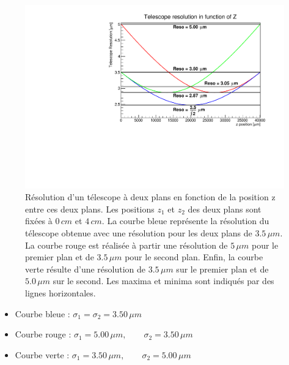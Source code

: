   \begin{figure}[!htb]
    \begin{center}
      \includegraphics[scale=0.6]{./figures/Plot_reso_vs_z/reso_vs_Z2.pdf}
      \caption{R\'esolution d'un t\'elescope \`a deux plans en fonction de la position z entre ces deux plans. Les positions $z_1$ et $z_2$ des deux plans sont fix\'ees \`a $0 \, cm$ et $4 \, cm$. La courbe bleue repr\'esente la r\'esolution du t\'elescope obtenue avec une r\'esolution pour les deux plans de $3.5 \, \mu m$. La courbe rouge est r\'ealis\'ee \`a partir une r\'esolution de $5 \, \mu m$ pour le premier plan et de $3.5 \,\mu m$ pour le second plan. Enfin, la courbe verte r\'esulte d'une r\'esolution de $3.5 \, \mu m$ sur le premier plan et de $5.0 \, \mu m$ sur le second. Les maxima et minima sont indiqu\'es par des lignes horizontales. }
      \label{fig:resoTelescope_Z}
    \end{center}
  \end{figure}  
  
  \medskip
   
  \renewcommand{\labelitemi}{$\bullet$}
  
  \begin{itemize}
   \item Courbe bleue : $\sigma_1 = \sigma_2 = 3.50 \, \mu m$
   \item Courbe rouge : $\sigma_1 = 5.00 \, \mu m, \qquad \sigma_2 = 3.50 \, \mu m$
   \item Courbe verte : $\sigma_1 = 3.50 \, \mu m, \qquad \sigma_2 = 5.00 \, \mu m$
  \end{itemize}  

  \medskip
 
